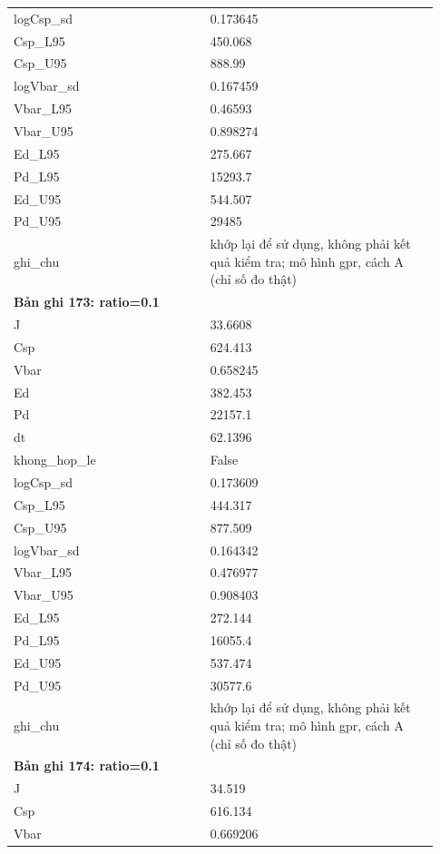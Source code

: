 \begin{longtable}{p{0.43\linewidth}p{0.50\linewidth}}
logCsp\_\allowbreak sd & 0.173645 \\
Csp\_\allowbreak L95 & 450.068 \\
Csp\_\allowbreak U95 & 888.99 \\
logVbar\_\allowbreak sd & 0.167459 \\
Vbar\_\allowbreak L95 & 0.46593 \\
Vbar\_\allowbreak U95 & 0.898274 \\
Ed\_\allowbreak L95 & 275.667 \\
Pd\_\allowbreak L95 & 15293.7 \\
Ed\_\allowbreak U95 & 544.507 \\
Pd\_\allowbreak U95 & 29485 \\
ghi\_\allowbreak chu & khớp lại để sử dụng, không phải kết quả kiểm tra; mô hình gpr, cách A (chỉ số đo thật) \\
\midrule
\multicolumn{2}{p{0.95\linewidth}}{\textbf{Bản ghi 173: ratio=0.1}} \\
J & 33.6608 \\
Csp & 624.413 \\
Vbar & 0.658245 \\
Ed & 382.453 \\
Pd & 22157.1 \\
dt & 62.1396 \\
khong\_\allowbreak hop\_\allowbreak le & False \\
logCsp\_\allowbreak sd & 0.173609 \\
Csp\_\allowbreak L95 & 444.317 \\
Csp\_\allowbreak U95 & 877.509 \\
logVbar\_\allowbreak sd & 0.164342 \\
Vbar\_\allowbreak L95 & 0.476977 \\
Vbar\_\allowbreak U95 & 0.908403 \\
Ed\_\allowbreak L95 & 272.144 \\
Pd\_\allowbreak L95 & 16055.4 \\
Ed\_\allowbreak U95 & 537.474 \\
Pd\_\allowbreak U95 & 30577.6 \\
ghi\_\allowbreak chu & khớp lại để sử dụng, không phải kết quả kiểm tra; mô hình gpr, cách A (chỉ số đo thật) \\
\midrule
\multicolumn{2}{p{0.95\linewidth}}{\textbf{Bản ghi 174: ratio=0.1}} \\
J & 34.519 \\
Csp & 616.134 \\
Vbar & 0.669206 \\

\end{longtable}

